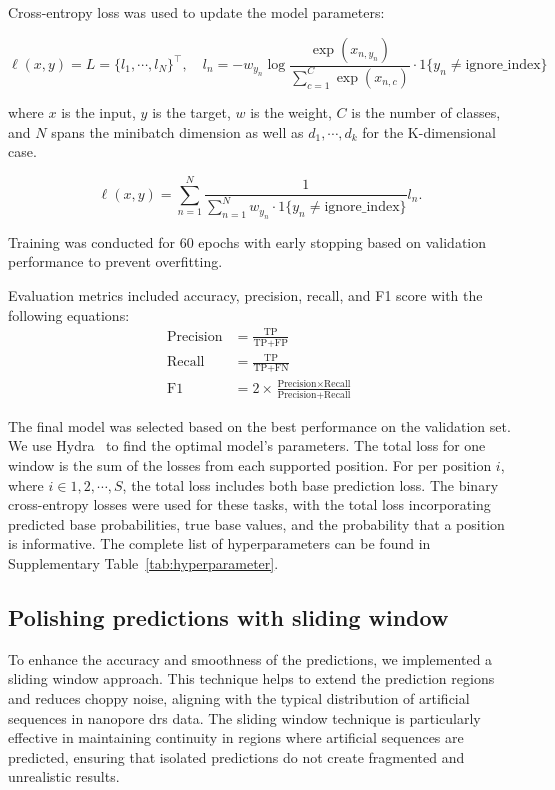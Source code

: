 \documentclass[pdflatex, sn-mathphys-num, lineno]{sn-jnl}%
\theoremstyle{thmstyleone}%
\theoremstyle{thmstyletwo}%
\theoremstyle{thmstylethree}%
\begin{document}
Cross-entropy loss was used to update the model parameters:

\[
	\ell(x, y) = L = \{l_1,\cdots,l_N\}^\top, \quad
	l_n = - w_{y_n} \log \frac{\exp(x_{n,y_n})}{\sum_{c=1}^C \exp(x_{n,c})}
	\cdot 1\{y_n \not= \textrm{ignore\_index}\}
\]

where \( x \) is the input, \( y \) is the target, \( w \) is the weight,
\( C \) is the number of classes, and \( N \) spans the minibatch dimension as well as
\( d_1, \cdots, d_k \) for the K-dimensional case.

\[
	\ell(x, y) =   \sum_{n=1}^N \frac{1}{\sum_{n=1}^N w_{y_n} \cdot 1\{y_n \not= \textrm{ignore\_index}\}} l_n
	.\]

Training was conducted for \num{60} epochs with early stopping based on validation performance to prevent overfitting.

Evaluation metrics included accuracy, precision, recall, and F1 score with the following equations:
\begin{align*}
	\textrm{Precision} & = \frac{\textrm{TP}}{\textrm{TP}+\textrm{FP}}                                                     \\
	\textrm{Recall}    & = \frac{\textrm{TP}}{\textrm{TP}+\textrm{FN}}                                                     \\
	\textrm{F1}        & = 2 \times \frac{\textrm{Precision} \times \textrm{Recall}}{\textrm{Precision} + \textrm{Recall}}
\end{align*}

The final model was selected based on the best performance on the validation set.
We use Hydra~\cite{Yadan2019Hydra} to find the optimal model's parameters.
The total loss for one window is the sum of the losses from each supported position.
For per position  \( i \), where \( i  \in {1, 2, \cdots, S} \),  the total loss includes both base prediction loss.
The binary cross-entropy losses were used for these tasks, with the total loss incorporating predicted base probabilities, true base values, and the probability that a position is informative.
The complete list of hyperparameters can be found in Supplementary Table~\ref{tab:hyperparameter}.

\subsection{Polishing predictions with sliding window}

To enhance the accuracy and smoothness of the predictions, we implemented a sliding window approach.
This technique helps to extend the prediction regions and reduces choppy noise, aligning with the typical distribution of artificial sequences in nanopore \gls{drs} data.
The sliding window technique is particularly effective in maintaining continuity in regions where artificial sequences are predicted, ensuring that isolated predictions do not create fragmented and unrealistic results.
\end{document}
